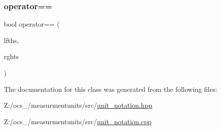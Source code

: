 \subsubsection{\texorpdfstring{operator==}{operator==}}
{\footnotesize\ttfamily bool operator== (\begin{DoxyParamCaption}\item[{const \hyperlink{classmunits_1_1_unit_notation_vector}{Unit\+Notation\+Vector} \&}]{lfths,  }\item[{const \hyperlink{classmunits_1_1_unit_notation_vector}{Unit\+Notation\+Vector} \&}]{rghts }\end{DoxyParamCaption})\hspace{0.3cm}{\ttfamily [friend]}}



The documentation for this class was generated from the following files\+:\begin{DoxyCompactItemize}
\item 
Z\+:/ocs\+\_/measurmentunits/src/\hyperlink{unit__notation_8hpp}{unit\+\_\+notation.\+hpp}\item 
Z\+:/ocs\+\_/measurmentunits/src/\hyperlink{unit__notation_8cpp}{unit\+\_\+notation.\+cpp}\end{DoxyCompactItemize}
